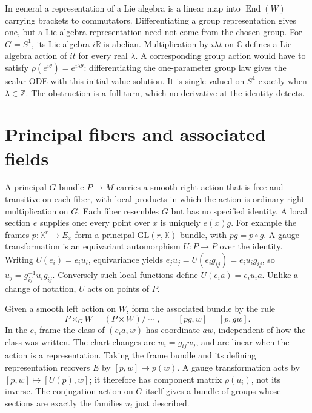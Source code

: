 In general a representation of a Lie algebra is a linear map into $\operatorname{End}(W)$ carrying brackets to commutators. Differentiating a group representation gives one, but a Lie algebra representation need not come from the chosen group. For $G=S^1$, its Lie algebra $i\mathbb R$ is abelian. Multiplication by $i\lambda t$ on $\mathbb C$ defines a Lie algebra action of $it$ for every real $\lambda$. A corresponding group action would have to satisfy $\rho(e^{i\theta})=e^{i\lambda\theta}$: differentiating the one-parameter group law gives the scalar ODE with this initial-value solution. It is single-valued on $S^1$ exactly when $\lambda\in\mathbb Z$. The obstruction is a full turn, which no derivative at the identity detects.

\section{Principal fibers and associated fields}

A principal $G$-bundle $P\to M$ carries a smooth right action that is free and transitive on each fiber, with local products in which the action is ordinary right multiplication on $G$. Each fiber resembles $G$ but has no specified identity. A local section $e$ supplies one: every point over $x$ is uniquely $e(x)g$. For example the frames $p:\mathbb K^r\to E_x$ form a principal $\mathrm{GL}(r,\mathbb K)$-bundle, with $p g=p\circ g$. A gauge transformation is an equivariant automorphism $U:P\to P$ over the identity. Writing $U(e_i)=e_i u_i$, equivariance yields $e_j u_j=U(e_i g_{ij})=e_i u_i g_{ij}$, so $u_j=g_{ij}^{-1}u_i g_{ij}$. Conversely such local functions define $U(e_i a)=e_i u_i a$. Unlike a change of notation, $U$ acts on points of $P$.

Given a smooth left action on $W$, form the associated bundle by the rule
\begin{equation}
 P\times_G W=(P\times W)/{\sim},\qquad [p g,w]=[p,g w] .\label{f:associated-bundle}
\end{equation}
In the $e_i$ frame the class of $(e_i a,w)$ has coordinate $a w$, independent of how the class was written. The chart changes are $w_i=g_{ij}w_j$, and are linear when the action is a representation. Taking the frame bundle and its defining representation recovers $E$ by $[p,w]\mapsto p(w)$. A gauge transformation acts by $[p,w]\mapsto[U(p),w]$; it therefore has component matrix $\rho(u_i)$, not its inverse. The conjugation action on $G$ itself gives a bundle of groups whose sections are exactly the families $u_i$ just described.

